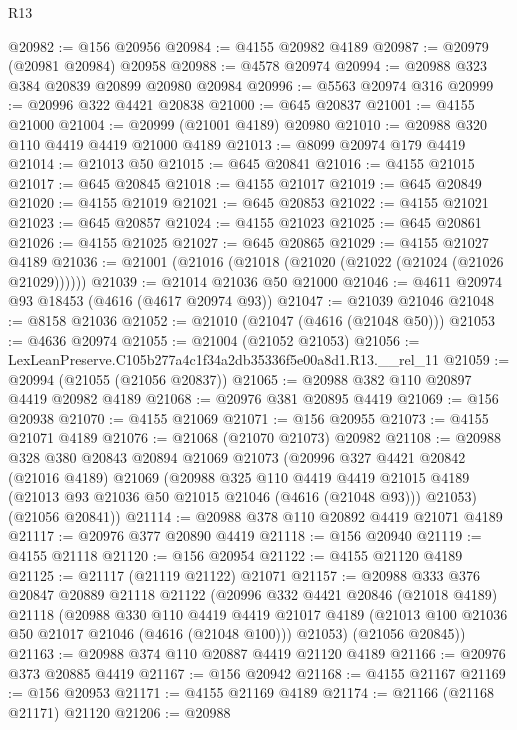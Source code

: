 \begin{lexlean}{R13}
\begin{coremodule}
@20982 := @156 @20956
@20984 := @4155 @20982 @4189
@20987 := @20979 (@20981 @20984) @20958
@20988 := @4578 @20974
@20994 := @20988 @323 @384 @20839 @20899 @20980 @20984
@20996 := @5563 @20974 @316
@20999 := @20996 @322 @4421 @20838
@21000 := @645 @20837
@21001 := @4155 @21000
@21004 := @20999 (@21001 @4189) @20980
@21010 := @20988 @320 @110 @4419 @4419 @21000 @4189
@21013 := @8099 @20974 @179 @4419
@21014 := @21013 @50
@21015 := @645 @20841
@21016 := @4155 @21015
@21017 := @645 @20845
@21018 := @4155 @21017
@21019 := @645 @20849
@21020 := @4155 @21019
@21021 := @645 @20853
@21022 := @4155 @21021
@21023 := @645 @20857
@21024 := @4155 @21023
@21025 := @645 @20861
@21026 := @4155 @21025
@21027 := @645 @20865
@21029 := @4155 @21027 @4189
@21036 := @21001 (@21016 (@21018 (@21020 (@21022 (@21024 (@21026 @21029))))))
@21039 := @21014 @21036 @50 @21000
@21046 := @4611 @20974 @93 @18453 (@4616 (@4617 @20974 @93))
@21047 := @21039 @21046
@21048 := @8158 @21036
@21052 := @21010 (@21047 (@4616 (@21048 @50)))
@21053 := @4636 @20974
@21055 := @21004 (@21052 @21053)
@21056 := LexLeanPreserve.C105b277a4c1f34a2db35336f5e00a8d1.R13.__rel_11
@21059 := @20994 (@21055 (@21056 @20837))
@21065 := @20988 @382 @110 @20897 @4419 @20982 @4189
@21068 := @20976 @381 @20895 @4419
@21069 := @156 @20938
@21070 := @4155 @21069
@21071 := @156 @20955
@21073 := @4155 @21071 @4189
@21076 := @21068 (@21070 @21073) @20982
@21108 := @20988
    @328
    @380
    @20843
    @20894
    @21069
    @21073
    (@20996
      @327
      @4421
      @20842
      (@21016 @4189)
      @21069
      (@20988
        @325
        @110
        @4419
        @4419
        @21015
        @4189
        (@21013 @93 @21036 @50 @21015 @21046 (@4616 (@21048 @93)))
        @21053)
      (@21056 @20841))
@21114 := @20988 @378 @110 @20892 @4419 @21071 @4189
@21117 := @20976 @377 @20890 @4419
@21118 := @156 @20940
@21119 := @4155 @21118
@21120 := @156 @20954
@21122 := @4155 @21120 @4189
@21125 := @21117 (@21119 @21122) @21071
@21157 := @20988
    @333
    @376
    @20847
    @20889
    @21118
    @21122
    (@20996
      @332
      @4421
      @20846
      (@21018 @4189)
      @21118
      (@20988
        @330
        @110
        @4419
        @4419
        @21017
        @4189
        (@21013 @100 @21036 @50 @21017 @21046 (@4616 (@21048 @100)))
        @21053)
      (@21056 @20845))
@21163 := @20988 @374 @110 @20887 @4419 @21120 @4189
@21166 := @20976 @373 @20885 @4419
@21167 := @156 @20942
@21168 := @4155 @21167
@21169 := @156 @20953
@21171 := @4155 @21169 @4189
@21174 := @21166 (@21168 @21171) @21120
@21206 := @20988

\end{coremodule}
\end{lexlean}
